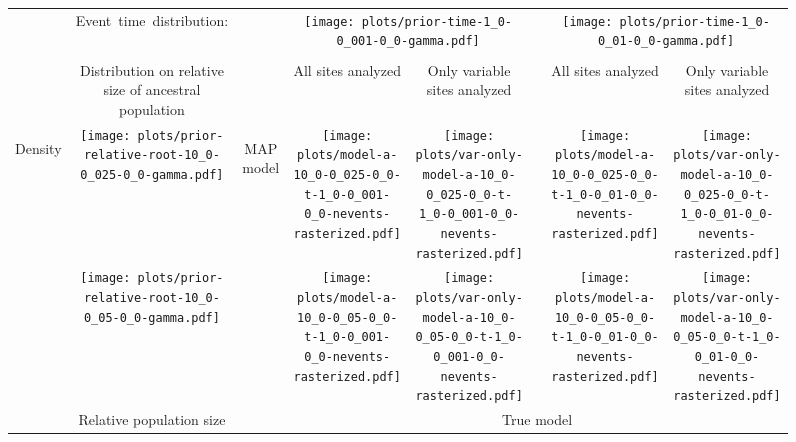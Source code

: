 \documentclass[border=10pt,varwidth=30cm]{standalone}
\begin{document}
\begin{figure}
    \centering
    \begin{tabular}{@{}cccccccc@{}}
        & \multirow{1}{0.15\textwidth}[8em]{\centering\Large Event~time~distribution:}
        &
        & \multicolumn{2}{c}{\texttt{[image: plots/prior-time-1\_0-0\_001-0\_0-gamma.pdf]}}
        &
        & \multicolumn{2}{c}{\texttt{[image: plots/prior-time-1\_0-0\_01-0\_0-gamma.pdf]}} \\
        \cline{1-2}\cline{4-5}\cline{7-8}
        & & & & & & & \\
        & \multirow{1}{0.15\textwidth}{\centering\Large Distribution on relative size of ancestral population}
        &
        & \multirow{1}{0.15\textwidth}{\centering\Large All sites analyzed}
        & \multirow{1}{0.15\textwidth}{\centering\Large Only variable sites analyzed}
        &
        & \multirow{1}{0.15\textwidth}{\centering\Large All sites analyzed}
        & \multirow{1}{0.15\textwidth}{\centering\Large Only variable sites analyzed} \\[9ex]
        \multirow{2}{*}[1em]{\begin{sideways}\large Density\end{sideways}}
        & \texttt{[image: plots/prior-relative-root-10\_0-0\_025-0\_0-gamma.pdf]}
        & \multirow{2}{*}[2em]{\begin{sideways}\large MAP model\end{sideways}}
        & \texttt{[image: plots/model-a-10\_0-0\_025-0\_0-t-1\_0-0\_001-0\_0-nevents-rasterized.pdf]}
        & \texttt{[image: plots/var-only-model-a-10\_0-0\_025-0\_0-t-1\_0-0\_001-0\_0-nevents-rasterized.pdf]}
        &
        & \texttt{[image: plots/model-a-10\_0-0\_025-0\_0-t-1\_0-0\_01-0\_0-nevents-rasterized.pdf]}
        & \texttt{[image: plots/var-only-model-a-10\_0-0\_025-0\_0-t-1\_0-0\_01-0\_0-nevents-rasterized.pdf]} \\
        & \texttt{[image: plots/prior-relative-root-10\_0-0\_05-0\_0-gamma.pdf]}
        &
        & \texttt{[image: plots/model-a-10\_0-0\_05-0\_0-t-1\_0-0\_001-0\_0-nevents-rasterized.pdf]}
        & \texttt{[image: plots/var-only-model-a-10\_0-0\_05-0\_0-t-1\_0-0\_001-0\_0-nevents-rasterized.pdf]}
        &
        & \texttt{[image: plots/model-a-10\_0-0\_05-0\_0-t-1\_0-0\_01-0\_0-nevents-rasterized.pdf]}
        & \texttt{[image: plots/var-only-model-a-10\_0-0\_05-0\_0-t-1\_0-0\_01-0\_0-nevents-rasterized.pdf]} \\
        & \multirow{1}{0.15\textwidth}{\centering\large Relative population size}
        &
        & \multicolumn{5}{c}{\large True model} \\
    \end{tabular}
\end{figure}
\end{document}
